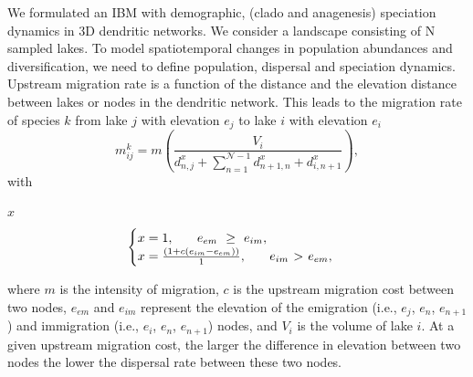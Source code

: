 \documentclass[10pt,landscape,final,a0paper,fontscale=0.285]{baposter}
\begin{document}
\begin{poster}
{    We formulated an IBM with demographic, (clado and anagenesis)
    speciation dynamics in 3D dendritic networks. We consider a
    landscape consisting of N sampled lakes. To model spatiotemporal
    changes in population abundances and diversification, we need to
    define population, dispersal and speciation dynamics. Upstream
    migration rate is a function of the distance and the elevation
    distance between lakes or nodes in the dendritic network. This
    leads to the migration rate of species $k$ from lake $j$ with
    elevation $e_{j}$ to lake $i$ with elevation $e_{i}$
\begin{equation}
  m^{k}_{ij} = m \left(\frac{V_{i}}{d_{n,j}^{x} + \sum\limits_{n = 1}^{\mathcal{N}-1} d_{n+1,n}^{x} + d_{i,n+1}^{x}}\right),
\label{dispfreq1}
\end{equation}
with
\begin{linenomath}
$x$
\begin{equation}
\begin{cases}
x = 1, \hspace{0.25 in} e_{em} \hspace{0.05 in} \geq \hspace{0.05 in} e_{im}, \\
x = \frac{(1 + c(e_{im} - e_{em}))}{1}, \hspace{0.25 in} e_{im} \hspace{0.05 in} $>$ \hspace{0.05 in} e_{em}, \\
\end{cases}
\end{equation}
\end{linenomath}
where $m$ is the intensity of migration, $c$ is the upstream migration
cost between two nodes, $e_{em}$ and $e_{im}$ represent the elevation
of the emigration (i.e., $e_{j}$, $e_{n}$, $e_{n+1}$) and immigration
(i.e., $e_{i}$, $e_{n}$, $e_{n+1}$) nodes, and $V_{i}$ is the volume
of lake $i$. At a given upstream migration cost, the larger the
difference in elevation between two nodes the lower the dispersal rate
between these two nodes.}


\end{poster}
\end{document}
